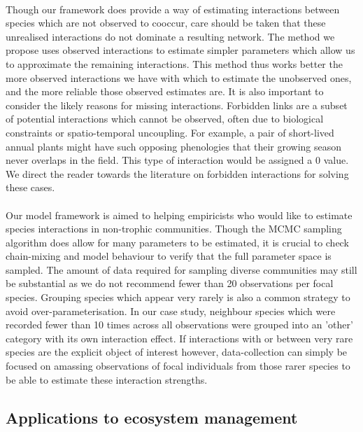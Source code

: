 \documentclass[a4,12pt]{article}
\begin{document}
        \paragraph{}
        Though our framework does provide a way of estimating interactions between species which are not observed to cooccur, care should be taken that these unrealised interactions do not dominate a resulting network. The method we propose uses observed interactions to estimate simpler parameters which allow us to approximate the remaining interactions. This method thus works better the more observed interactions we have with which to estimate the unobserved ones, and the more reliable those observed estimates are. It is also important to consider the likely reasons for missing interactions. Forbidden links are a subset of potential interactions which cannot be observed, often due to biological constraints or spatio-temporal uncoupling. For example, a pair of short-lived annual plants might have such opposing phenologies that their growing season never overlaps in the field. This type of interaction would be assigned a 0 value. We direct the reader towards the literature on forbidden interactions \parencite{Olesen2011, Jordano2016} for solving these cases. 

        \paragraph{}
        Our model framework is aimed to helping empiricists who would like to estimate species interactions in non-trophic communities. Though the MCMC sampling algorithm does allow for many parameters to be estimated, it is crucial to check chain-mixing and model behaviour to verify that the full parameter space is sampled. The amount of data required for sampling diverse communities may still be substantial as we do not recommend fewer than 20 observations per focal species. Grouping species which appear very rarely is also a common strategy to avoid over-parameterisation. In our case study, neighbour species which were recorded fewer than 10 times across all observations were grouped into an 'other' category with its own interaction effect. If interactions with or between very rare species are the explicit object of interest however, data-collection can simply be focused on amassing observations of focal individuals from those rarer species to be able to estimate these interaction strengths.   


    \subsection{Applications to ecosystem management}
\end{document}
